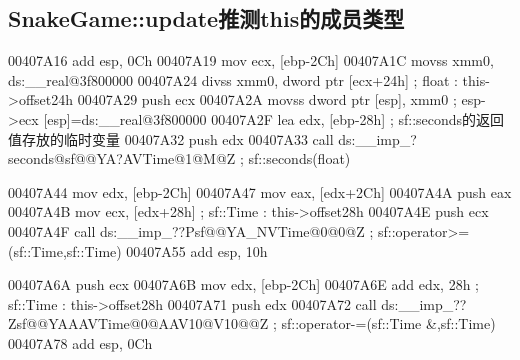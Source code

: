 \documentclass[AutoFakeBold,AutoFakeSlant]{beamer}
\begin{document}
	\subsection{SnakeGame::update推测this的成员类型}
	\begin{frame}[fragile]
		\tiny
		\linespread{1.2} \selectfont
\begin{x86asmcode}
00407A16  add     esp, 0Ch
00407A19  mov     ecx, [ebp-2Ch]
00407A1C  movss   xmm0, ds:__real@3f800000
00407A24  divss   xmm0, dword ptr [ecx+24h] ; float : this->offset24h
00407A29  push    ecx
00407A2A  movss   dword ptr [esp], xmm0 ; esp->ecx  [esp]=ds:__real@3f800000
00407A2F  lea     edx, [ebp-28h] ; sf::seconds的返回值存放的临时变量
00407A32  push    edx
00407A33  call    ds:__imp_?seconds@sf@@YA?AVTime@1@M@Z ; sf::seconds(float)

00407A44  mov     edx, [ebp-2Ch]
00407A47  mov     eax, [edx+2Ch] 
00407A4A  push    eax
00407A4B  mov     ecx, [edx+28h] ; sf::Time : this->offset28h
00407A4E  push    ecx
00407A4F  call    ds:__imp_??Psf@@YA_NVTime@0@0@Z ; sf::operator>=(sf::Time,sf::Time)
00407A55  add     esp, 10h

00407A6A  push    ecx
00407A6B  mov     edx, [ebp-2Ch]
00407A6E  add     edx, 28h ; sf::Time : this->offset28h
00407A71  push    edx
00407A72  call    ds:__imp_??Zsf@@YAAAVTime@0@AAV10@V10@@Z ; sf::operator-=(sf::Time &,sf::Time)
00407A78  add     esp, 0Ch\end{x86asmcode}
	\end{frame}
	
\end{document}
